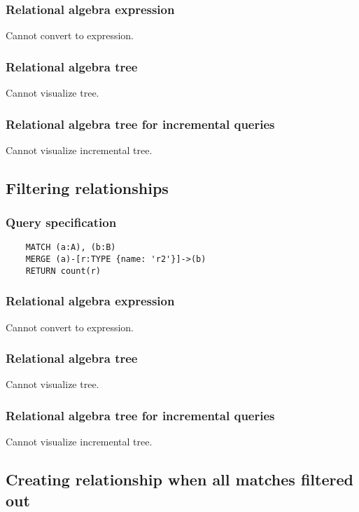 	\subsubsection*{Relational algebra expression}

	Cannot convert to expression.

	\subsubsection*{Relational algebra tree}

	Cannot visualize tree.

	\subsubsection*{Relational algebra tree for incremental queries}

	Cannot visualize incremental tree.
	\subsection{Filtering relationships}

	\subsubsection*{Query specification}

	\begin{lstlisting}
	MATCH (a:A), (b:B)
	MERGE (a)-[r:TYPE {name: 'r2'}]->(b)
	RETURN count(r)
	\end{lstlisting}


	\subsubsection*{Relational algebra expression}

	Cannot convert to expression.

	\subsubsection*{Relational algebra tree}

	Cannot visualize tree.

	\subsubsection*{Relational algebra tree for incremental queries}

	Cannot visualize incremental tree.
	\subsection{Creating relationship when all matches filtered out}

